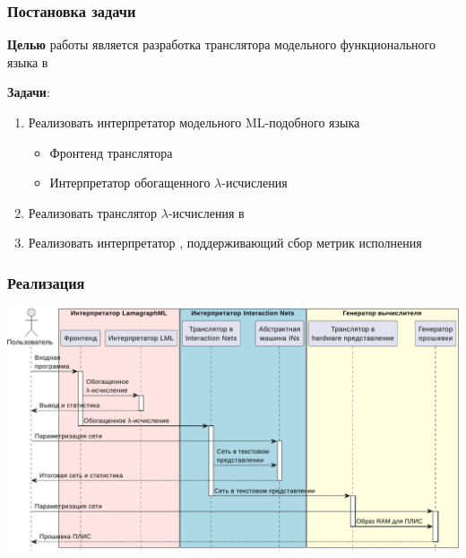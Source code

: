 \documentclass
  [ russian
  , aspectratio=169 %
  ] {beamer}
\begin{document}
\begin{frame}
    \frametitle{Постановка задачи}

    \textbf{Целью} работы является разработка транслятора модельного функционального языка в \INs{}
    \vspace{1em}

    \textbf{Задачи}:
    \begin{enumerate}
        \item Реализовать интерпретатор модельного ML-подобного языка
              \begin{itemize}
                  \item Фронтенд транслятора
                  \item Интерпретатор обогащенного $\lambda$-исчисления
              \end{itemize}
        \item Реализовать транслятор $\lambda$-исчисления в \INs{}
        \item Реализовать интерпретатор \INs{}, поддерживающий сбор метрик исполнения
    \end{enumerate}

\end{frame}

\begin{frame}
    \frametitle{Реализация}

    \begin{center}
        \includegraphics[width=0.8\linewidth]{figures/using.pdf}
    \end{center}

\end{frame}
\end{document}

